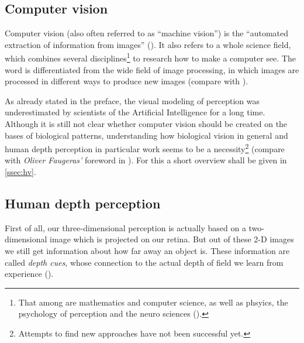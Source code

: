 \subsection{Computer vision}\label{ssec:cv}
Computer vision (also often referred to as \enquote{machine vision}) is the \enquote{automated extraction of information from images} (\cite{Lowe.2016}). It also refers to a whole science field, which combines several disciplines\footnote{That among are mathematics and computer science, as well as phsyics, the psychology of perception and the neuro sciences (\cite[p.xi]{Hartley.2011}).} to research how to make a computer see. The word is differentiated from the wide field of image processing, in which images are processed in different ways to produce new images (compare with \cite{Lowe.2016}).
 
As already stated in the preface, the visual modeling of perception was underestimated by scientists of the Artificial Intelligence for a long time. Although it is still not clear whether computer vision should be created on the bases of biological patterns, understanding how biological vision in general and human depth perception in particular work seems to be a necessity\footnote{Attempts to find new approaches have  not been successful yet.} (compare with \textit{Oliver Faugeras'} foreword in \cite[p.xi]{Hartley.2011}). For this a short overview shall be given in \autoref{ssec:hv}.  

 
\subsection{Human depth perception}\label{ssec:hv}
First of all, our three-dimensional perception is actually based on a two-dimensional image which is projected on our retina. But out of these 2-D images we still get information about how far away an object is. These information are called \textit{depth cues}, whose connection to the actual depth of field we learn from experience (\cite[p.28]{Hottong.2009}). 

